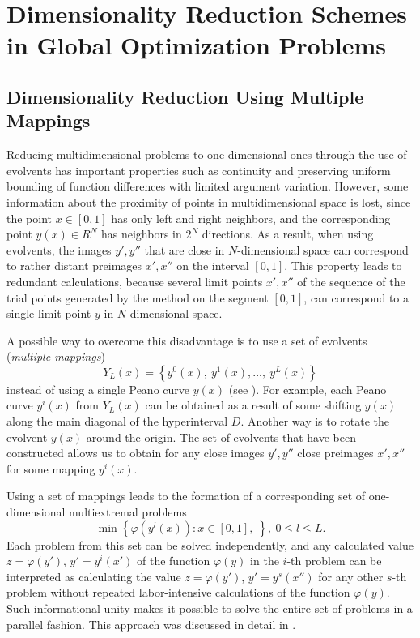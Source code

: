 \documentclass{svproc}
\begin{document}
\section{Dimensionality Reduction Schemes in Global Optimization Problems}

\subsection{Dimensionality Reduction Using Multiple Mappings}

Reducing multidimensional problems to one-dimensional ones through the use of evolvents has important properties such as continuity and preserving uniform bounding of function differences with limited argument variation. However, some information about the proximity of points in multidimensional space is lost, since the point \(x\in [0,1]\) has only left and right neighbors, and the corresponding point \(y(x) \in R^N\) has neighbors in \(2^N\) directions. As a result, when using evolvents, the images \(y' , y''\) that are close in \(N\)-dimensional space can correspond to rather distant preimages \(x' , x''\) on the interval \([0,1]\). This property leads to redundant calculations, because several limit points \(x' , x''\) of the sequence of the trial points generated by the method on the segment \([0,1]\), can correspond to a single limit point \(y\) in \(N\)-dimensional space.

A possible way to overcome this disadvantage is to use a set of evolvents (\textit{multiple mappings})
\begin{displaymath}
\label{eq:142}
Y_L(x)=\left\{y^0(x),\ y^1(x),...,\ y^L(x)\right\}
\end{displaymath}
instead of using a single Peano curve \(y(x)\) (see \cite{Strongin1992,Strongin2000}). For example, each Peano curve \(y^i(x)\) from \(Y_L(x)\) can be obtained as a result of some shifting \(y(x)\) along the main diagonal of the hyperinterval \(D\). Another way is to rotate the evolvent \(y(x)\) around the origin. The set of evolvents that have been constructed allows us to obtain for any close images \(y', y''\) close preimages \(x', x''\) for some mapping \(y^i(x)\).

Using a set of mappings leads to the formation of a corresponding set of one-dimensional multiextremal problems
\begin{displaymath}
\label{6_problem_l}
\min{\left\{\varphi(y^l(x)):x\in [0,1], \;  \right\}}, \ 0 \leqslant l \leqslant L.
\end{displaymath}
Each problem from this set can be solved independently, and any calculated value \(z= \varphi(y')\), \(y'=y^i(x')\) of the function \(\varphi(y)\) in the \(i\)-th problem can be interpreted as calculating the value \(z= \varphi(y')\), \(y'=y^s(x'')\) for any other \(s\)-th problem without repeated labor-intensive calculations of the function \(\varphi(y)\). Such informational unity makes it possible to solve the entire set of problems in a parallel fashion. This approach was discussed in detail in \cite{Barkalov2019}.
\end{document}
